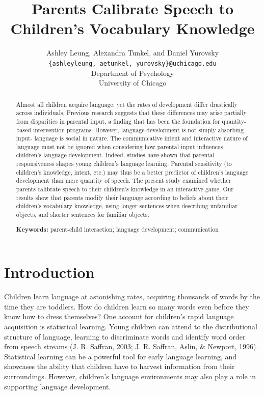 \documentclass[10pt, letterpaper]{article}
\title{Parents Calibrate Speech to Children's Vocabulary Knowledge}
\author{Ashley Leung, Alexandra Tunkel, and Daniel Yurovsky \\
        \texttt{\{ashleyleung, aetunkel, yurovsky\}@uchicago.edu} \\
       Department of Psychology \\ University of Chicago}
\begin{document}
\maketitle

\begin{abstract}
Almost all children acquire language, yet the rates of development
differ drastically across individuals. Previous research suggests that
these differences may arise partially from disparities in parental
input, a finding that has been the foundation for quantity-based
intervention programs. However, language development is not simply
absorbing input- language is social in nature. The communicative intent
and interactive nature of language must not be ignored when considering
how parental input influences children's language development. Indeed,
studies have shown that parental responsiveness shapes young children's
language learning. Parental sensitivity (to children's knowledge,
intent, etc.) may thus be a better predictor of children's language
development than mere quantity of speech. The present study examined
whether parents calibrate speech to their children's knowledge in an
interactive game. Our results show that parents modify their language
according to beliefs about their children's vocabulary knowledge, using
longer sentences when describing unfamiliar objects, and shorter
sentences for familiar objects.

\textbf{Keywords:}
parent-child interaction; language development; communication
\end{abstract}

\section{Introduction}\label{introduction}

Children learn language at astonishing rates, acquiring thousands of
words by the time they are toddlers. How do children learn so many words
even before they know how to dress themselves? One account for
children's rapid language acquisition is statistical learning. Young
children can attend to the distributional structure of language,
learning to discriminate words and identify word order from speech
streams (J. R. Saffran, 2003; J. R. Saffran, Aslin, \& Newport, 1996).
Statistical learning can be a powerful tool for early language learning,
and showcases the ability that children have to harvest information from
their surroundings. However, children's language environments may also
play a role in supporting language development.
\end{document}
